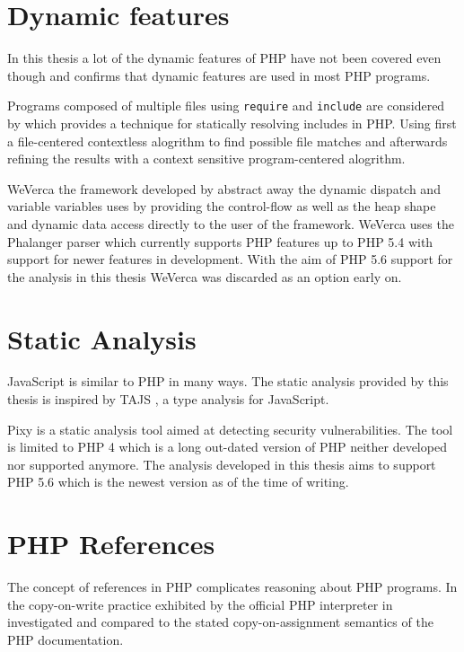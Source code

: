 \section{Dynamic features}
In this thesis a lot of the dynamic features of PHP have not been covered even though  and  confirms that dynamic features are used in most PHP programs.

Programs composed of multiple files using \texttt{require} and \texttt{include} are considered by  which provides a technique for statically resolving includes in PHP. Using first a file-centered contextless alogrithm to find possible file matches and afterwards refining the results with a context sensitive program-centered alogrithm.

WeVerca the framework developed by  abstract away the dynamic dispatch and variable variables uses by providing the control-flow as well as the heap shape and dynamic data access directly to the user of the framework. WeVerca uses the Phalanger parser which currently supports PHP features up to PHP 5.4 with support for newer features in development. With the aim of PHP 5.6 support for the analysis in this thesis WeVerca was discarded as an option early on.

\section{Static Analysis}
JavaScript is similar to PHP in many ways. The static analysis provided by this thesis is inspired by TAJS , a type analysis for JavaScript. 

Pixy  is a static analysis tool aimed at detecting security vulnerabilities. The tool is limited to PHP 4 which is a long out-dated version of PHP neither developed nor supported anymore. The analysis developed in this thesis aims to support PHP 5.6 which is the newest version as of the time of writing.

\section{PHP References}
The concept of references in PHP complicates reasoning about PHP programs. In  the copy-on-write practice exhibited by the official PHP interpreter in investigated and compared to the stated copy-on-assignment semantics of the PHP documentation.

